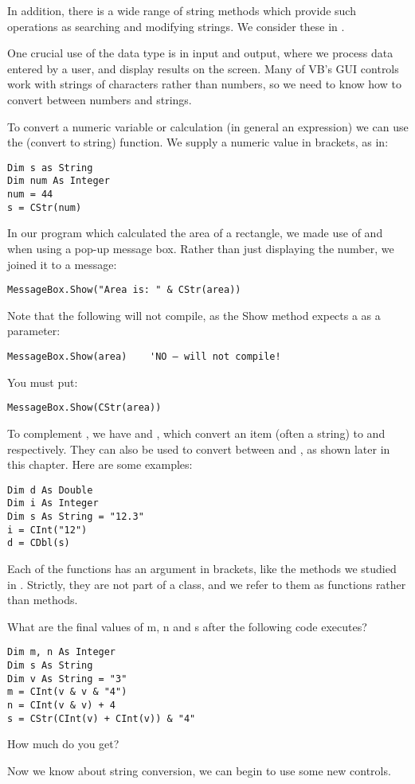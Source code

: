 		In addition, there is a wide range of string methods which provide such operations as searching and modifying strings. We consider these in .
		
		One crucial use of the  data type is in input and output, where we process data entered by a user, and display results on the screen. Many of VB's GUI controls work with strings of characters rather than numbers, so we need to know how to convert between numbers and strings.
		
		To convert a numeric variable or calculation (in general an expression) we can use the  (convert to string) function. We supply a numeric value in brackets, as in:
		\begin{lstlisting}
Dim s as String
Dim num As Integer
num = 44
s = CStr(num)
		\end{lstlisting}
		In our program which calculated the area of a rectangle, we made use of \keyword{\&} and  when using a pop-up message box. Rather than just displaying the number, we joined it to a message:
		\begin{lstlisting}
MessageBox.Show("Area is: " & CStr(area))
		\end{lstlisting}
		Note that the following will not compile, as the Show method expects a  as a parameter:
		\begin{lstlisting}
MessageBox.Show(area)    'NO – will not compile!
		\end{lstlisting}
		You must put:
		\begin{lstlisting}
MessageBox.Show(CStr(area))
		\end{lstlisting}
		To complement , we have  and , which convert an item (often a string) to  and  respectively. They can also be used to convert between  and , as shown later in this chapter. Here are some examples:
		\begin{lstlisting}
Dim d As Double
Dim i As Integer
Dim s As String = "12.3"
i = CInt("12")
d = CDbl(s)
		\end{lstlisting}
		Each of the functions has an argument in brackets, like the methods we studied in . Strictly, they are not part of a class, and we refer to them as functions rather than methods.


		\begin{stqb}
			\begin{STQ}
				\item	What are the final values of m, n and s after the following code executes?	
					\begin{lstlisting}
Dim m, n As Integer
Dim s As String
Dim v As String = "3"
m = CInt(v & v & "4")
n = CInt(v & v) + 4
s = CStr(CInt(v) + CInt(v)) & "4"
					\end{lstlisting}
					How much do you get?
			\end{STQ}
		\end{stqb}
		Now we know about string conversion, we can begin to use some new controls.

